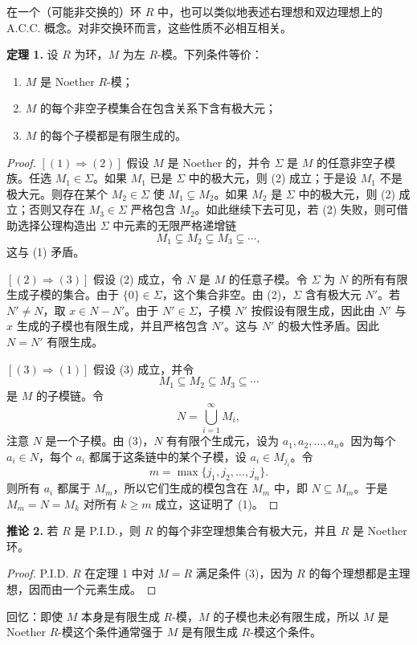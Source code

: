 在一个（可能非交换的）环 $R$ 中，也可以类似地表述右理想和双边理想上的 A.C.C. 概念。对非交换环而言，这些性质不必相互相关。

\noindent\textbf{定理 1.} 设 $R$ 为环，$M$ 为左 $R$-模。下列条件等价：
\begin{enumerate}[label=(\arabic*)]
\item $M$ 是 Noether $R$-模；
\item $M$ 的每个非空子模集合在包含关系下含有极大元；
\item $M$ 的每个子模都是有限生成的。
\end{enumerate}

\begin{proof}
$[(1)\Rightarrow(2)]$ 假设 $M$ 是 Noether 的，并令 $\Sigma$ 是 $M$ 的任意非空子模族。任选 $M_1\in\Sigma$。如果 $M_1$ 已是 $\Sigma$ 中的极大元，则 (2) 成立；于是设 $M_1$ 不是极大元。则存在某个 $M_2\in\Sigma$ 使 $M_1\subsetneq M_2$。如果 $M_2$ 是 $\Sigma$ 中的极大元，则 (2) 成立；否则又存在 $M_3\in\Sigma$ 严格包含 $M_2$。如此继续下去可见，若 (2) 失败，则可借助选择公理构造出 $\Sigma$ 中元素的无限严格递增链
\[
M_1\subsetneq M_2\subsetneq M_3\subsetneq\cdots,
\]
这与 (1) 矛盾。

$[(2)\Rightarrow(3)]$ 假设 (2) 成立，令 $N$ 是 $M$ 的任意子模。令 $\Sigma$ 为 $N$ 的所有有限生成子模的集合。由于 $\{0\}\in\Sigma$，这个集合非空。由 (2)，$\Sigma$ 含有极大元 $N'$。若 $N'\neq N$，取 $x\in N-N'$。由于 $N'\in\Sigma$，子模 $N'$ 按假设有限生成，因此由 $N'$ 与 $x$ 生成的子模也有限生成，并且严格包含 $N'$。这与 $N'$ 的极大性矛盾。因此 $N=N'$ 有限生成。

$[(3)\Rightarrow(1)]$ 假设 (3) 成立，并令
\[
M_1\subseteq M_2\subseteq M_3\subseteq\cdots
\]
是 $M$ 的子模链。令
\[
N=\bigcup_{i=1}^{\infty}M_i,
\]
注意 $N$ 是一个子模。由 (3)，$N$ 有有限个生成元，设为 $a_1,a_2,\ldots,a_n$。因为每个 $a_i\in N$，每个 $a_i$ 都属于这条链中的某个子模，设 $a_i\in M_{j_i}$。令
\[
m=\max\{j_1,j_2,\ldots,j_n\}.
\]
则所有 $a_i$ 都属于 $M_m$，所以它们生成的模包含在 $M_m$ 中，即 $N\subseteq M_m$。于是 $M_m=N=M_k$ 对所有 $k\geq m$ 成立，这证明了 (1)。
\end{proof}

\noindent\textbf{推论 2.} 若 $R$ 是 P.I.D.，则 $R$ 的每个非空理想集合有极大元，并且 $R$ 是 Noether 环。

\begin{proof}
P.I.D. $R$ 在定理 1 中对 $M=R$ 满足条件 (3)，因为 $R$ 的每个理想都是主理想，因而由一个元素生成。
\end{proof}

回忆：即使 $M$ 本身是有限生成 $R$-模，$M$ 的子模也未必有限生成，所以 $M$ 是 Noether $R$-模这个条件通常强于 $M$ 是有限生成 $R$-模这个条件。

